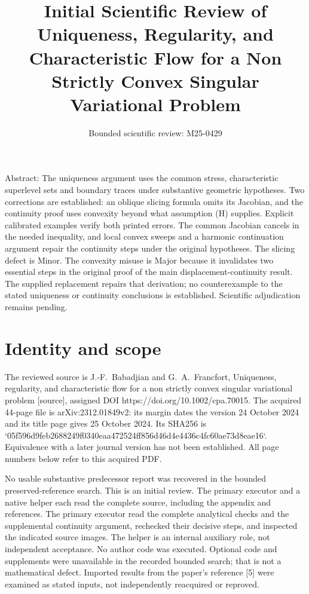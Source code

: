 \documentclass[10pt]{article}
\title{Initial Scientific Review of
Uniqueness, Regularity, and Characteristic Flow
for a Non Strictly Convex Singular Variational Problem}
\author{Bounded scientific review: M25-0429}
\date{}
\begin{document}
\maketitle
Abstract: The uniqueness argument uses the common stress, characteristic superlevel sets and boundary traces under substantive geometric hypotheses. Two corrections are established: an oblique slicing formula omits its Jacobian, and the continuity proof uses convexity beyond what assumption (H) supplies. Explicit calibrated examples verify both printed errors. The common Jacobian cancels in the needed inequality, and local convex sweeps and a harmonic continuation argument repair the continuity steps under the original hypotheses. The slicing defect is Minor. The convexity misuse is Major because it invalidates two essential steps in the original proof of the main displacement-continuity result. The supplied replacement repairs that derivation; no counterexample to the stated uniqueness or continuity conclusions is established. Scientific adjudication remains pending.\par
\section*{Identity and scope}
The reviewed source is J.-F. Babadjian and G. A. Francfort, Uniqueness, regularity, and characteristic flow for a non strictly convex singular variational problem [source], assigned DOI https://doi.org/10.1002/cpa.70015. The acquired 44-page file is arXiv:2312.01849v2: its margin dates the version 24 October 2024 and its title page gives 25 October 2024. Its SHA256 is `05f596d9feb2688249f0340eaa472524ff856d46d4e4436c4fc60ae73d8eae16`. Equivalence with a later journal version has not been established. All page numbers below refer to this acquired PDF.\par
No usable substantive predecessor report was recovered in the bounded preserved-reference search. This is an initial review. The primary executor and a native helper each read the complete source, including the appendix and references. The primary executor read the complete analytical checks and the supplemental continuity argument, rechecked their decisive steps, and inspected the indicated source images. The helper is an internal auxiliary role, not independent acceptance. No author code was executed. Optional code and supplements were unavailable in the recorded bounded search; that is not a mathematical defect. Imported results from the paper’s reference [5] were examined as stated inputs, not independently reacquired or reproved.\par
\end{document}
